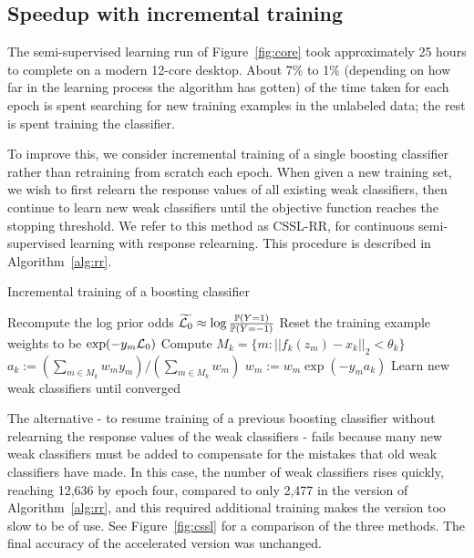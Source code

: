 \documentclass[conference]{IEEEtran}
\newcommand{\logprior}{\log \frac{\Pr(Y = 1)}{\Pr(Y = -1)}}
\begin{document}
\subsection{Speedup with incremental training}
\label{sec:rr}

The semi-supervised learning run of Figure~\ref{fig:core} took approximately 25 hours to complete on a modern 12-core desktop.  About 7\% to 1\% (depending on how far in the learning process the algorithm has gotten) of the time taken for each epoch is spent searching for new training examples in the unlabeled data; the rest is spent training the classifier.

To improve this, we consider incremental training of a single boosting classifier rather than retraining from scratch each epoch.  When given a new training set, we wish to first relearn the response values of all existing weak classifiers, then continue to learn new weak classifiers until the objective function reaches the stopping threshold.  We refer to this method as CSSL-RR, for continuous semi-supervised learning with response relearning.  This procedure is described in Algorithm~\ref{alg:rr}.

\begin{algorithm}[h]
  \caption{Incremental training of a boosting classifier}
  \label{alg:rr}
  \begin{algorithmic}
    \STATE Recompute the log prior odds $\widetilde{\L_0} \approx \logprior$
    \STATE Reset the training example weights to be $\exp(-y_m \mathcal{L}_0)$
    \STATE Compute $M_k = \{m : ||f_k(z_m) - x_k||_2 < \theta_k\}$
    \STATE $a_k := \left( \sum_{m \in M_k} w_m y_m \right) /  \left( \sum_{m \in M_k} w_m \right)$
    \STATE $w_m := w_m \exp(-y_m a_k)$
    \ENDFOR
    \ENDFOR
    \STATE Learn new weak classifiers until converged
  \end{algorithmic}
\end{algorithm}

The \naive alternative - to resume training of a previous boosting classifier without relearning the response values of the weak classifiers - fails because many new weak classifiers must be added to compensate for the mistakes that old weak classifiers have made.  In this case, the number of weak classifiers rises quickly, reaching 12,636 by epoch four, compared to only 2,477 in the version of Algorithm~\ref{alg:rr}, and this required additional training makes the \naive version too slow to be of use.  See Figure~\ref{fig:cssl} for a comparison of the three methods.  The final accuracy of the accelerated version was unchanged.
\end{document}

